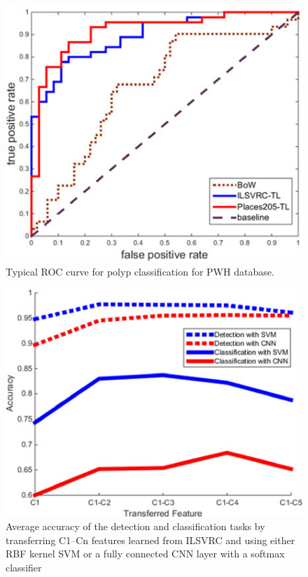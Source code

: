 \documentclass[10pt,twocolumn,letterpaper]{article}
\begin{document}
\begin{figure}[t]
	\begin{center}
		\includegraphics[width=0.8\linewidth]{Pic/7.jpg}
	\end{center}
	\caption{Typical ROC curve for polyp classification for PWH database.}
	\label{fig:lonmng}

\end{figure}

\begin{figure}[t]
	\begin{center}
		\includegraphics[width=0.8\linewidth]{Pic/8.jpg}
	\end{center}
	\caption{Average accuracy of the detection and classification tasks by transferring C1–Cn features learned from ILSVRC and using either RBF kernel SVM or a fully connected CNN layer with a softmax classifier}
	\label{fig:longbng}

\end{figure}
\end{document}
